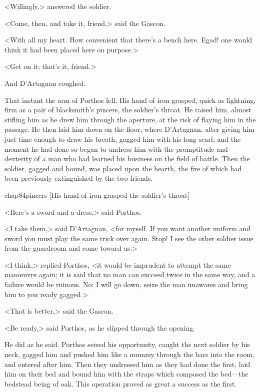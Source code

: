 <Willingly,> answered the soldier.

<Come, then, and take it, friend,> said the Gascon.

<With all my heart. How convenient that there's a bench here. Egad! one would think it had been placed here on purpose.>

<Get on it; that's it, friend.>

And D'Artagnan coughed.

That instant the arm of Porthos fell. His hand of iron grasped, quick as lightning, firm as a pair of blacksmith's pincers, the soldier's throat. He raised him, almost stifling him as he drew him through the aperture, at the risk of flaying him in the passage. He then laid him down on the floor, where D'Artagnan, after giving him just time enough to draw his breath, gagged him with his long scarf; and the moment he had done so began to undress him with the promptitude and dexterity of a man who had learned his business on the field of battle. Then the soldier, gagged and bound, was placed upon the hearth, the fire of which had been previously extinguished by the two friends.

\begin{bwbigpic}
	[\basicscale] 
	{chap84pincers}
	[His hand of iron grasped the soldier's throat]
\end{bwbigpic}

<Here's a sword and a dress,> said Porthos.

<I take them,> said D'Artagnan, <for myself. If you want another uniform and sword you must play the same trick over again. Stop! I see the other soldier issue from the guardroom and come toward us.>

<I think,> replied Porthos, <it would be imprudent to attempt the same manœuvre again; it is said that no man can succeed twice in the same way, and a failure would be ruinous. No; I will go down, seize the man unawares and bring him to you ready gagged.>

<That is better,> said the Gascon.

<Be ready,> said Porthos, as he slipped through the opening.

He did as he said. Porthos seized his opportunity, caught the next soldier by his neck, gagged him and pushed him like a mummy through the bars into the room, and entered after him. Then they undressed him as they had done the first, laid him on their bed and bound him with the straps which composed the bed—the bedstead being of oak. This operation proved as great a success as the first.

